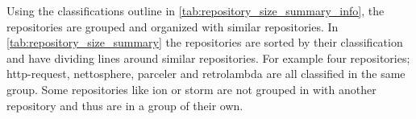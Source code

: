 
Using the classifications outline in \autoref{tab:repository_size_summary_info}, the repositories are grouped and organized with similar repositories. In \autoref{tab:repository_size_summary} the repositories are sorted by their classification and have dividing lines around similar repositories. For example four repositories; http-request, nettosphere, parceler and retrolambda are all classified in the same group. Some repositories like ion or storm are not grouped in with another repository and thus are in a group of their own.

